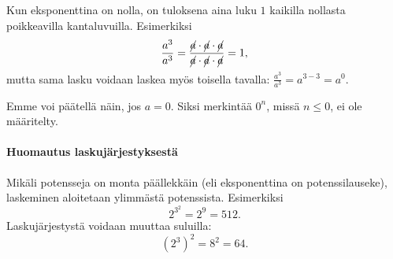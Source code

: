     
    Kun eksponenttina on nolla, on tuloksena aina luku $1$ kaikilla nollasta poikkeavilla kantaluvuilla. 
    Esimerkiksi
    \[
        \frac{a^3}{a^3}=\frac{\cancel{a}\cdot \cancel{a}\cdot \cancel{a}}{\cancel{a}\cdot \cancel{a}\cdot \cancel{a}}=1,
    \]
    mutta sama lasku voidaan laskea myös toisella tavalla: $\frac{a^3}{a^3}=a^{3-3}=a^0$.
  

Emme voi päätellä näin, jos $a = 0$. Siksi merkintää $0^n$, missä $n \leq 0$,
ei ole määritelty.   

%    
%   

\paragraph*{Huomautus laskujärjestyksestä}

Mikäli potensseja on monta päällekkäin (eli eksponenttina on potenssilauseke),
laskeminen aloitetaan ylimmästä potenssista. Esimerkiksi
\[2^{3^2}= 2^9 = 512. \]
Laskujärjestystä voidaan muuttaa suluilla:
\[(2^3)^2=8^2=64. \]

